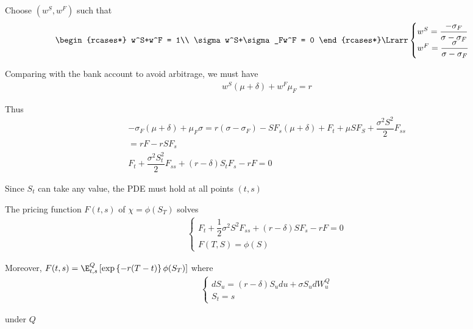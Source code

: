 \noindent Choose $(w^S,w^F)$ such that
\begin{equation*}
  \begin{gathered}
    \begin{rcases*}
      w^S+w^F = 1\\
      \sigma w^S+\sigma_Fw^F = 0
    \end{rcases*}\Lrarr
    \begin{cases}
      w^S = \dfrac{-\sigma_F}{\sigma-\sigma_F}\\
      w^F =\dfrac{\sigma}{\sigma-\sigma_F}
    \end{cases}
  \end{gathered}
\end{equation*}
\par\bigskip
\noindent Comparing with the bank account to avoid arbitrage, we must have
\begin{equation*}
  \begin{gathered}
    w^S(\mu+\delta)+w^F\mu_F =r
  \end{gathered}
\end{equation*}\par
\noindent Thus
\begin{equation*}
  \begin{gathered}
    -\sigma_F(\mu+\delta)+\mu_F\sigma = r(\sigma-\sigma_F)-SF_s(\mu+\delta)+F_t+\mu SF_S+\dfrac{\sigma^2S^2}{2}F_{ss}\\
    = rF-rSF_s\\
    F_t +\dfrac{\sigma^2S_t^2}{2}F_{ss}+\left(r-\delta\right)S_tF_s-rF=0
  \end{gathered}
\end{equation*}\par
\noindent Since $S_t$ can take any value, the PDE must hold at all points $(t,s)$
\par\bigskip
\begin{lem}[]{}
  The pricing function $F(t,s)$ of $\chi = \phi(S_T)$ solves
  \begin{equation*}
    \begin{gathered}
      \begin{cases}
        F_t + \dfrac{1}{2}\sigma^2S^2F_{ss}+(r-\delta)SF_s -rF=0\\
        F(T,S) = \phi(S)
      \end{cases}
    \end{gathered}
  \end{equation*}
  \par\bigskip
  \noindent Moreover, $F(t,s) =\E_{t,s}^Q\left[\text{exp}\left\{-r(T-t)\right\}\phi(S_T)\right]$ where
  \begin{equation*}
    \begin{gathered}
      \begin{cases}
        dS_u = (r-\delta)S_udu+\sigma S_udW_u^Q\\
        S_t = s
      \end{cases}
    \end{gathered}
  \end{equation*}\par
  \noindent under $Q$
\end{lem}
